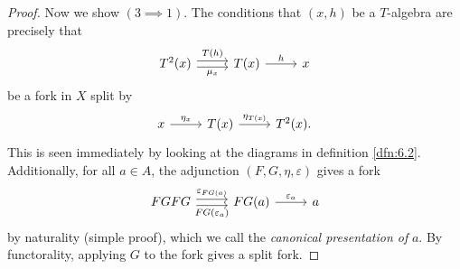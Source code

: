 \begin{proof}
	Now we show $(3\implies 1)$. The conditions that $(x,h)$ be a $T$-algebra are precisely that
	\[\begin{tikzcd}[row sep = 2.5em, column sep = 2.5em]
	T^2(x) \ar[" T(h) ", shift left, r] \ar[" \mu_x "', shift right, r]  & T(x) \ar[" h ", r]  & x
	\end{tikzcd}\]
	be a fork in $X$ split by
	\[\begin{tikzcd}[row sep = 2.5em, column sep = 2.5em]
	x \ar[" \eta_x ", r]  & T(x) \ar[" \eta_{T(x)}  ", r]  & T^2(x).
	\end{tikzcd}\]
	This is seen immediately by looking at the diagrams in definition \ref{dfn:6.2}. Additionally, for all $a\in A$, the adjunction $(F,G,\eta,\varepsilon )$ gives a fork
	\[\begin{tikzcd}[row sep = 2.5em, column sep = 2.5em]
	FGFG \ar[" \varepsilon _{FG(a)}  ", shift left, r] \ar[" FG(\varepsilon _a) "', shift right, r]  & FG(a)\ar[" \varepsilon _a ", r]  & a
	\end{tikzcd}\]
	by naturality (simple proof), which we call the \emph{canonical presentation of} $a$. By functorality, applying $G$ to the fork gives a split fork.


\end{proof}
